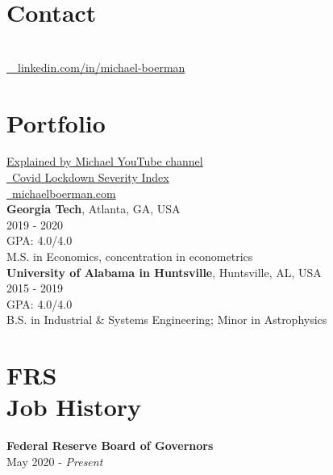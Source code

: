\documentclass[margin,line]{res}
\begin{document}

\begin{resume}
\section{\sc Contact}

 \\
\faLinkedinIn  \href{https://www.linkedin.com/in/michael-boerman}{\ttfamily \, \, linkedin.com/in/michael-boerman}\\
\vspace{-.35cm}



\section{\sc Portfolio}
 \href{https://www.youtube.com/channel/UCxFMrMb6PrS7SOrQi-BfMUw/videos?view=0&sort=p&flow=grid}{ Explained by Michael YouTube channel}\\
\faChartLine \href{https://github.com/michaelboerman/lockdown_severity_index#readme}{\, Covid Lockdown Severity Index}\\
\faBriefcase \href{https://michaelboerman.com/}{\ttfamily  \, michaelboerman.com}\\



\vspace{-.35cm}
{\bf Georgia Tech}, Atlanta, GA, USA\\
2019 - 2020\\
GPA: 4.0/4.0\\
M.S. in Economics, concentration in econometrics\\

\vspace{-.35cm}
{\bf University of Alabama in Huntsville}, Huntsville, AL, USA\\
2015 - 2019\\
GPA: 4.0/4.0\\
B.S. in Industrial \& Systems Engineering; Minor in Astrophysics\\

\vspace{-.35cm}
\section{\sc FRS \\ Job History}
{\bf Federal Reserve Board of Governors}\\
May 2020 - {\it Present}\\
\vspace{-.65cm}


\end{resume}
\end{document}
